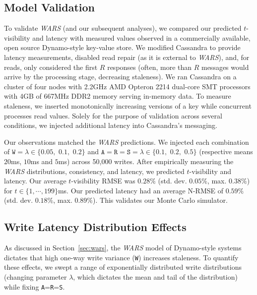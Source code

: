 \documentclass{vldb}
\newcommand{\subsectionskip}{-0em}
\begin{document}
\vspace{\subsectionskip}\subsection{Model Validation}

To validate \textit{WARS} (and our subsequent analyses), we compared
our predicted $t$-visibility and latency with measured values observed
in a commercially available, open source Dynamo-style key-value store.
We modified Cassandra to provide latency measurements, disabled read
repair (as it is external to \textit{WARS}), and, for reads, only
considered the first $R$ responses (often, more than $R$ messages
would arrive by the processing stage, decreasing staleness).  We ran
Cassandra on a cluster of four nodes with 2.2GHz AMD Opteron 2214
dual-core SMT processors with 4GB of 667MHz DDR2 memory serving
in-memory data.  To measure staleness, we inserted monotonically
increasing versions of a key while concurrent processes read values.
Solely for the purpose of validation across several conditions, we
injected additional latency into Cassandra's messaging.

Our observations matched the \textit{WARS} predictions. We injected
each combination of $\texttt{W}=\lambda \in \{0.05,$ $0.1,$ $0.2\}$
and $\texttt{A}$$=$$\texttt{R}$$=$$\texttt{S}=\lambda \in \{0.1,$
$0.2,$ $0.5\}$ (respective means $20$ms, $10$ms and $5$ms) across
50,000 writes.  After empirically measuring the \textit{WARS}
distributions, consistency, and latency, we predicted $t$-visibility and
latency. Our average $t$-visibility RMSE was $0.28\%$
(std. dev. $0.05\%$, max. $0.38\%$) for $t\in\{1,\cdots,199\}$ms. Our
predicted latency had an average N-RMSE of $0.59\%$
(std. dev. $0.18\%$, max. $0.89\%$).  This validates our Monte Carlo
simulator.

\vspace{\subsectionskip}\subsection{Write Latency Distribution Effects}
\label{sec:synthetic}

As discussed in Section~\ref{sec:wars}, the \textit{WARS} model of
Dynamo-style systems dictates that high one-way write variance
(\texttt{W}) increases staleness.  To quantify these effects, we swept
a range of exponentially distributed write distributions (changing
parameter $\lambda$, which dictates the mean and tail of the
distribution) while fixing \texttt{A}=\texttt{R}=\texttt{S}.
\end{document}
